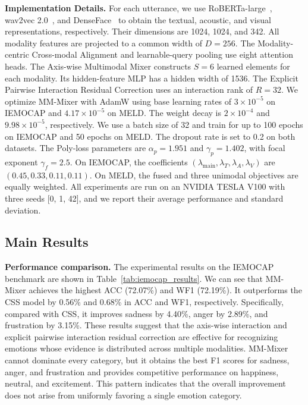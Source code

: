 \documentclass[letterpaper]{article} %
\begin{document}
\noindent\textbf{Implementation Details.}
For each utterance, we use RoBERTa-large~\cite{liu2019roberta},
wav2vec 2.0~\cite{baevski2020wav2vec}, and
DenseFace~\cite{zhao2018emotion} to obtain the textual, acoustic, and
visual representations, respectively. Their dimensions are 1024,
1024, and 342. %
All modality features are projected to a common width of $D=256$.
The Modality-centric Cross-modal Alignment and learnable-query pooling
use eight attention heads. The Axis-wise Multimodal Mixer constructs
$S=6$ learned elements for each modality. Its hidden-feature MLP has a
hidden width of 1536. The Explicit Pairwise
Interaction Residual Correction uses an interaction rank of $R=32$.
We optimize MM-Mixer with AdamW using base learning rates of
$3\times10^{-5}$ on IEMOCAP and $4.17\times10^{-5}$ on MELD. The
weight decay is $2\times10^{-4}$ and $9.98\times10^{-5}$,
respectively. We use a batch size of 32 and train for up to 100 epochs
on IEMOCAP and 50 epochs on MELD. The dropout rate is set to 0.2 on
both datasets. The Poly-loss parameters are
$\alpha_p=1.951$ and $\gamma_p=1.402$, with focal exponent
$\gamma_f=2.5$. On IEMOCAP, the coefficients
$(\lambda_{\mathrm{main}},\lambda_T,\lambda_A,\lambda_V)$ are
$(0.45,0.33,0.11,0.11)$. On MELD, the fused and three unimodal
objectives are equally weighted. All experiments are run on an NVIDIA TESLA V100 with three seeds [0, 1, 42], and we report their average performance and standard deviation.

\subsection{Main Results}
\noindent\textbf{Performance comparison.}
The experimental results on the IEMOCAP benchmark are shown in Table~\ref{tab:iemocap_results}. We can see that MM-Mixer achieves the highest ACC (72.07\%) and WF1 (72.19\%). It outperforms the CSS model by 0.56\% and 0.68\% in ACC and WF1, respectively. Specifically, compared with CSS, it improves sadness by 4.40\%, anger by 2.89\%, and frustration by 3.15\%. These results suggest that the axis-wise interaction and explicit pairwise interaction residual correction are effective for recognizing emotions whose evidence is distributed across multiple modalities. MM-Mixer cannot dominate every category, but it obtains the best F1 scores for sadness, anger, and frustration and provides competitive performance on happiness, neutral, and excitement. This pattern indicates that the overall improvement does not arise from uniformly favoring a single emotion category.
\end{document}

